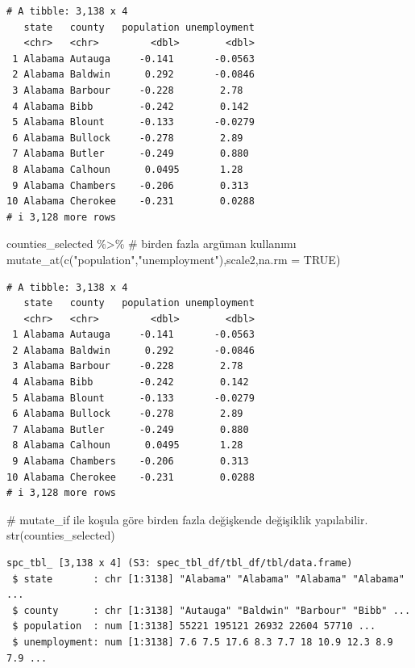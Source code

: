 \documentclass[
  letterpaper,
  DIV=11,
  numbers=noendperiod]{scrreprt}
\newenvironment{Shaded}{\begin{snugshade}}{\end{snugshade}}
\newcommand{\AttributeTok}[1]{\textcolor[rgb]{0.40,0.45,0.13}{#1}}
\newcommand{\CommentTok}[1]{\textcolor[rgb]{0.37,0.37,0.37}{#1}}
\newcommand{\ConstantTok}[1]{\textcolor[rgb]{0.56,0.35,0.01}{#1}}
\newcommand{\FunctionTok}[1]{\textcolor[rgb]{0.28,0.35,0.67}{#1}}
\newcommand{\NormalTok}[1]{\textcolor[rgb]{0.00,0.23,0.31}{#1}}
\newcommand{\SpecialCharTok}[1]{\textcolor[rgb]{0.37,0.37,0.37}{#1}}
\newcommand{\StringTok}[1]{\textcolor[rgb]{0.13,0.47,0.30}{#1}}
\begin{document}
\begin{verbatim}
# A tibble: 3,138 x 4
   state   county   population unemployment
   <chr>   <chr>         <dbl>        <dbl>
 1 Alabama Autauga     -0.141       -0.0563
 2 Alabama Baldwin      0.292       -0.0846
 3 Alabama Barbour     -0.228        2.78  
 4 Alabama Bibb        -0.242        0.142 
 5 Alabama Blount      -0.133       -0.0279
 6 Alabama Bullock     -0.278        2.89  
 7 Alabama Butler      -0.249        0.880 
 8 Alabama Calhoun      0.0495       1.28  
 9 Alabama Chambers    -0.206        0.313 
10 Alabama Cherokee    -0.231        0.0288
# i 3,128 more rows
\end{verbatim}

\begin{Shaded}
\begin{Highlighting}[]
\NormalTok{counties\_selected }\SpecialCharTok{\%\textgreater{}\%} \CommentTok{\# birden fazla argüman kullanımı}
  \FunctionTok{mutate\_at}\NormalTok{(}\FunctionTok{c}\NormalTok{(}\StringTok{"population"}\NormalTok{,}\StringTok{"unemployment"}\NormalTok{),scale2,}\AttributeTok{na.rm =} \ConstantTok{TRUE}\NormalTok{)}
\end{Highlighting}
\end{Shaded}

\begin{verbatim}
# A tibble: 3,138 x 4
   state   county   population unemployment
   <chr>   <chr>         <dbl>        <dbl>
 1 Alabama Autauga     -0.141       -0.0563
 2 Alabama Baldwin      0.292       -0.0846
 3 Alabama Barbour     -0.228        2.78  
 4 Alabama Bibb        -0.242        0.142 
 5 Alabama Blount      -0.133       -0.0279
 6 Alabama Bullock     -0.278        2.89  
 7 Alabama Butler      -0.249        0.880 
 8 Alabama Calhoun      0.0495       1.28  
 9 Alabama Chambers    -0.206        0.313 
10 Alabama Cherokee    -0.231        0.0288
# i 3,128 more rows
\end{verbatim}

\begin{Shaded}
\begin{Highlighting}[]
\CommentTok{\# mutate\_if ile koşula göre birden fazla değişkende değişiklik yapılabilir.}
\FunctionTok{str}\NormalTok{(counties\_selected)}
\end{Highlighting}
\end{Shaded}

\begin{verbatim}
spc_tbl_ [3,138 x 4] (S3: spec_tbl_df/tbl_df/tbl/data.frame)
 $ state       : chr [1:3138] "Alabama" "Alabama" "Alabama" "Alabama" ...
 $ county      : chr [1:3138] "Autauga" "Baldwin" "Barbour" "Bibb" ...
 $ population  : num [1:3138] 55221 195121 26932 22604 57710 ...
 $ unemployment: num [1:3138] 7.6 7.5 17.6 8.3 7.7 18 10.9 12.3 8.9 7.9 ...
\end{verbatim}
\end{document}
